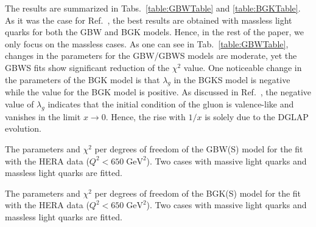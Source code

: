 \documentclass[11pt]{article}
\begin{document}
The results are summarized in Tabs.~\ref{table:GBWTable} and \ref{table:BGKTable}. As it was the case for Ref.~\cite{gbs2018}, the best results are obtained with massless light quarks for both the GBW and BGK models. Hence, in the rest of the paper, we only focus on the massless cases.
As one can see in Tab.~\ref{table:GBWTable}, changes in the parameters for the GBW/GBWS models are moderate, yet the GBWS fits show significant reduction of the $\chi^2$ value.
One noticeable change in the parameters of the BGK model is that $\lambda_g$ in the BGKS model is negative while  the value for the BGK model is positive. As discussed in Ref.~\cite{bgk2002}, the negative value of  $\lambda_g$ indicates that the initial condition of the gluon is valence-like and vanishes in the limit $x\rightarrow0$. Hence, the rise with $1/x$ is solely due to the DGLAP evolution.
\begin{table}[H]
\hfill

\hfill
\caption{ The parameters and $\chi^2$ per degrees of freedom of the GBW(S) model for the fit with the HERA data ($Q^2<650\;\mathrm{ GeV^2}$). Two cases with massive light quarks and massless light quarks are fitted.   }
\label{table:GBWTable}
\end{table}
\begin{table}[H]
\hfill

\hfill
\caption{ The parameters and $\chi^2$ per degrees of freedom  of the BGK(S) model for the fit with the HERA data ($Q^2<650\;\mathrm{GeV^2}$). Two cases with massive light quarks and massless light quarks are fitted.}
\label{table:BGKTable}
\end{table}

\begin{table}[H]
\hfill
\hfill

\hfill
\caption{%
Comparison of the quality of fits with different upper limits $Q^2_{\mathrm{up}}\; \mathrm{(GeV^2)} $ of the hard scale. }
\label{table:Qup}
\end{table}
\end{document}
